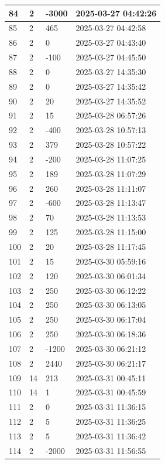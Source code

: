 \begin{longtable}{|l|l|l|l|}
84 & 2 & -3000 & 2025-03-27 04:42:26 \\ \hline 
85 & 2 & 465 & 2025-03-27 04:42:58 \\ \hline 
86 & 2 & 0 & 2025-03-27 04:43:40 \\ \hline 
87 & 2 & -100 & 2025-03-27 04:45:50 \\ \hline 
88 & 2 & 0 & 2025-03-27 14:35:30 \\ \hline 
89 & 2 & 0 & 2025-03-27 14:35:42 \\ \hline 
90 & 2 & 20 & 2025-03-27 14:35:52 \\ \hline 
91 & 2 & 15 & 2025-03-28 06:57:26 \\ \hline 
92 & 2 & -400 & 2025-03-28 10:57:13 \\ \hline 
93 & 2 & 379 & 2025-03-28 10:57:22 \\ \hline 
94 & 2 & -200 & 2025-03-28 11:07:25 \\ \hline 
95 & 2 & 189 & 2025-03-28 11:07:29 \\ \hline 
96 & 2 & 260 & 2025-03-28 11:11:07 \\ \hline 
97 & 2 & -600 & 2025-03-28 11:13:47 \\ \hline 
98 & 2 & 70 & 2025-03-28 11:13:53 \\ \hline 
99 & 2 & 125 & 2025-03-28 11:15:00 \\ \hline 
100 & 2 & 20 & 2025-03-28 11:17:45 \\ \hline 
101 & 2 & 15 & 2025-03-30 05:59:16 \\ \hline 
102 & 2 & 120 & 2025-03-30 06:01:34 \\ \hline 
103 & 2 & 250 & 2025-03-30 06:12:22 \\ \hline 
104 & 2 & 250 & 2025-03-30 06:13:05 \\ \hline 
105 & 2 & 250 & 2025-03-30 06:17:04 \\ \hline 
106 & 2 & 250 & 2025-03-30 06:18:36 \\ \hline 
107 & 2 & -1200 & 2025-03-30 06:21:12 \\ \hline 
108 & 2 & 2440 & 2025-03-30 06:21:17 \\ \hline 
109 & 14 & 213 & 2025-03-31 00:45:11 \\ \hline 
110 & 14 & 1 & 2025-03-31 00:45:59 \\ \hline 
111 & 2 & 0 & 2025-03-31 11:36:15 \\ \hline 
112 & 2 & 5 & 2025-03-31 11:36:25 \\ \hline 
113 & 2 & 5 & 2025-03-31 11:36:42 \\ \hline 
114 & 2 & -2000 & 2025-03-31 11:56:55 \\ \hline 

\end{longtable}
